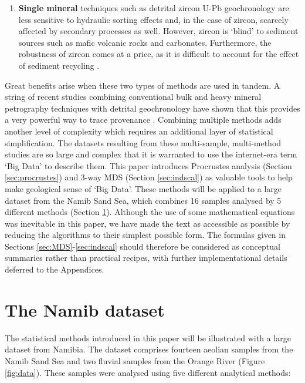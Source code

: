 \documentclass{article}
\begin{document}
\begin{enumerate}
\begin{enumerate}
\item{\bf Single mineral} techniques such as detrital zircon U-Pb
  geochronology are less sensitive to hydraulic sorting effects and,
  in the case of zircon, scarcely affected by secondary processes as
  well. However, zircon is `blind' to sediment sources such as mafic
  volcanic rocks and carbonates. Furthermore, the robustness of zircon
  comes at a price, as it is difficult to account for the effect of
  sediment recycling \citep{garzanti2013}.
\end{enumerate}

Great benefits arise when these two types of methods are used in
tandem. A string of recent studies combining conventional bulk and
heavy mineral petrography techniques with detrital geochronology have
shown that this provides a very powerful way to trace provenance
\citep[e.g,][]{stevens2013, garzanti2012, garzanti2014b,
  garzanti2014c}.  Combining multiple methods adds another level of
complexity which requires an additional layer of statistical
simplification.  The datasets resulting from these multi-sample,
multi-method studies are so large and complex that it is warranted to
use the internet-era term `Big Data' to describe them.  This paper
introduces Procrustes analysis (Section \ref{sec:procrustes}) and
3-way MDS (Section \ref{sec:indscal}) as valuable tools to help make
geological sense of `Big Data'. These methods will be applied to a
large dataset from the Namib Sand Sea, which combines 16 samples
analysed by 5 different methods (Section \ref{sec:data}). Although the
use of some mathematical equations was inevitable in this paper, we
have made the text as accessible as possible by reducing the
algorithms to their simplest possible form. The formulas given in
Sections \ref{sec:MDS}-\ref{sec:indscal} should therefore be
considered as conceptual summaries rather than practical recipes, with
further implementational details deferred to the Appendices.

\end{enumerate}

\section{The Namib dataset}
\label{sec:data}

The statistical methods introduced in this paper will be illustrated
with a large dataset from Namibia. The dataset comprises fourteen
aeolian samples from the Namib Sand Sea and two fluvial samples from
the Orange River (Figure \ref{fig:data}).  These samples were analysed
using five different analytical methods:
\end{document}
